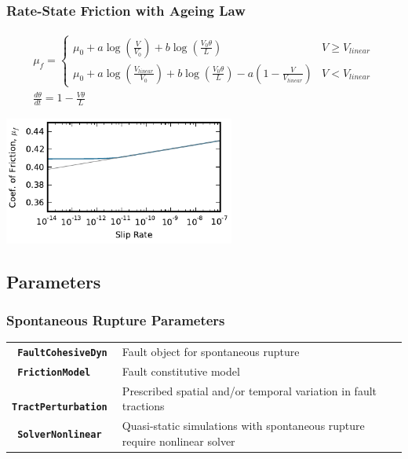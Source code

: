 \documentclass{beamer}
\begin{document}
\begin{frame}
  \frametitle{Rate-State Friction with Ageing Law}
  
  \begin{gather}
    \mu_f = \left\{ \begin{array}{ll}
        \mu_0 + a \log (\frac{V}{V_0}) + b \log (\frac{V_0 \theta}{L}) & V \ge V_\mathit{linear} \\
        \mu_0 + a \log (\frac{V_\mathit{linear}}{V_0}) + b \log
        (\frac{V_0\theta}{L}) - a (1 - \frac{V}{V_\mathit{linear}}) & V
        < V_\mathit{linear}
      \end{array} \right. \\
    \frac{d \theta}{dt} = 1 - \frac{V \theta}{L}
  \end{gather}
  \begin{center}
    \includegraphics[height=1.65in]{figs/friction_ratestate}
  \end{center}
  
\end{frame}


\subsection{Parameters}

\begin{frame}
  \frametitle{Spontaneous Rupture Parameters}
  
  \begin{tabular}{lp{3in}}
    {\tt\bf\color{green} FaultCohesiveDyn} & Fault object for
    spontaneous rupture \\
    {\tt\bf\color{green}  FrictionModel} & Fault constitutive model \\
    {\tt\bf\color{green}  TractPerturbation} & Prescribed spatial and/or temporal
    variation in fault tractions \\
    {\tt\bf\color{green}  SolverNonlinear} & Quasi-static simulations with
    spontaneous rupture require nonlinear solver
  \end{tabular}
  
\end{frame}
\end{document}
